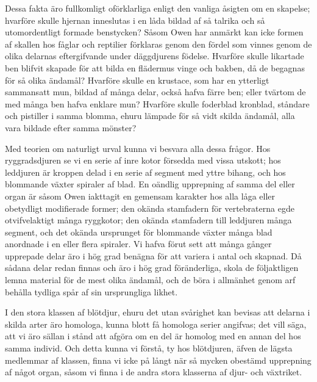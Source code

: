 Dessa fakta äro fullkomligt oförklarliga enligt den vanliga åsigten om en skapelse; hvarföre skulle hjernan inneslutas i en låda bildad af så talrika och så utomordentligt formade benstycken? Såsom Owen har anmärkt kan icke formen af skallen hos fåglar och reptilier förklaras genom den fördel som vinnes genom de olika delarnas eftergifvande under däggdjurens födelse. Hvarföre skulle likartade ben blifvit skapade för att bilda en flädermus vinge och bakben, då de begagnas för så olika ändamål? Hvarföre skulle en krustace, som har en ytterligt sammansatt mun, bildad af många delar, också hafva färre ben; eller tvärtom de med många ben hafva enklare mun? Hvarföre skulle foderblad kronblad, ståndare och pistiller i samma blomma, ehuru lämpade för så vidt skilda ändamål, alla vara bildade efter samma mönster?

Med teorien om naturligt urval kunna vi besvara alla dessa frågor. Hos ryggradsdjuren se vi en serie af inre kotor försedda med vissa utskott; hos leddjuren är kroppen delad i en serie af segment med yttre bihang, och hos blommande växter spiraler af blad. En oändlig upprepning af samma del eller organ är såsom Owen iakttagit en gemensam karakter hos alla låga eller obetydligt modifierade former; den okända stamfadern för vertebraterna egde otvifvelaktigt många ryggkotor; den okända stamfadern till leddjuren många segment, och det okända ursprunget för blommande växter många blad anordnade i en eller flera spiraler. Vi hafva förut sett att många gånger upprepade delar äro i hög grad benägna för att variera i antal och skapnad. Då sådana delar redan finnas och äro i hög grad föränderliga, skola de följaktligen lemna material för de mest olika ändamål, och de böra i allmänhet genom arf behålla tydliga spår af sin ursprungliga likhet.

I den stora klassen af blötdjur, ehuru det utan svårighet kan bevisas att delarna i skilda arter äro homologa, kunna blott få homologa serier angifvas; det vill säga, att vi äro sällan i stånd att afgöra om en del är homolog med en annan del hos samma individ. Och detta kunna vi förstå, ty hos blötdjuren, äfven de lägsta medlemmar af klassen, finna vi icke på långt när så mycken obestämd upprepning af något organ, såsom vi finna i de andra stora klasserna af djur- och växtriket.

